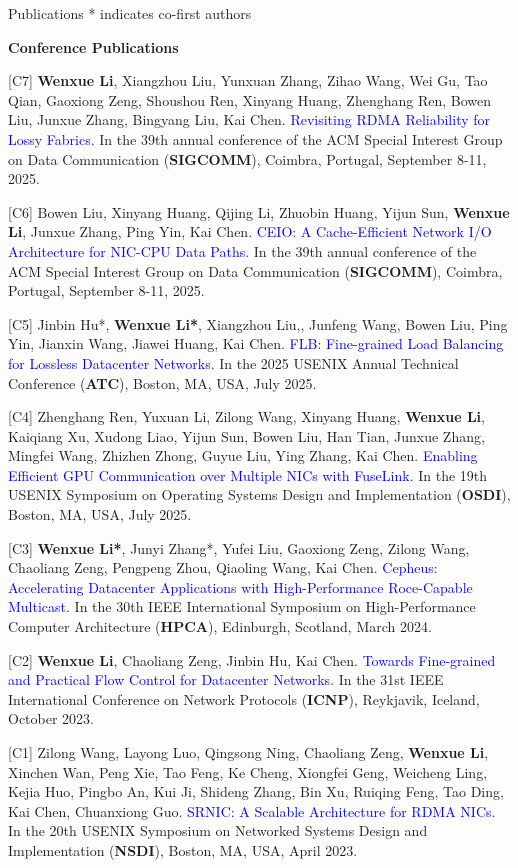\documentclass{resume} %
\newcommand{\blue}[1]{\textcolor{blue}{#1}}
\begin{document}
\begin{rSection}{Publications}
* indicates co-first authors 

\textbf{Conference Publications}

[C7] \textbf{Wenxue Li}, Xiangzhou Liu, Yunxuan Zhang, Zihao Wang, Wei Gu, Tao Qian, Gaoxiong Zeng, Shoushou Ren, Xinyang Huang, Zhenghang Ren, Bowen Liu, Junxue Zhang, Bingyang Liu, Kai Chen. \blue{Revisiting RDMA Reliability for Lossy Fabrics.} In the 39th annual conference of the ACM Special Interest Group on Data Communication (\textbf{SIGCOMM}), Coimbra, Portugal, September 8-11, 2025.

[C6] Bowen Liu, Xinyang Huang, Qijing Li, Zhuobin Huang, Yijun Sun, \textbf{Wenxue Li}, Junxue Zhang, Ping Yin, Kai Chen. \blue{CEIO: A Cache-Efficient Network I/O Architecture for NIC-CPU Data Paths.} In the 39th annual conference of the ACM Special Interest Group on Data Communication (\textbf{SIGCOMM}), Coimbra, Portugal, September 8-11, 2025.

[C5] Jinbin Hu*, \textbf{Wenxue Li*}, Xiangzhou Liu,, Junfeng Wang, Bowen Liu, Ping Yin, Jianxin Wang, Jiawei Huang, Kai Chen. \blue{FLB: Fine-grained Load Balancing for Lossless Datacenter Networks.} In the 2025 USENIX Annual Technical Conference (\textbf{ATC}), Boston, MA, USA, July 2025.

[C4] Zhenghang Ren, Yuxuan Li, Zilong Wang, Xinyang Huang, \textbf{Wenxue Li}, Kaiqiang Xu, Xudong Liao, Yijun Sun, Bowen Liu, Han Tian, Junxue Zhang, Mingfei Wang, Zhizhen Zhong, Guyue Liu, Ying Zhang, Kai Chen. \blue{Enabling Efficient GPU Communication over Multiple NICs with FuseLink.} In the 19th USENIX Symposium on Operating Systems Design and Implementation (\textbf{OSDI}), Boston, MA, USA, July 2025.

[C3] \textbf{Wenxue Li*}, Junyi Zhang*, Yufei Liu, Gaoxiong Zeng, Zilong Wang, Chaoliang Zeng, Pengpeng Zhou, Qiaoling Wang, Kai Chen. \blue{Cepheus: Accelerating Datacenter Applications with High-Performance Roce-Capable Multicast.} In the 30th IEEE International Symposium on High-Performance Computer Architecture (\textbf{HPCA}), Edinburgh, Scotland, March 2024.

[C2] \textbf{Wenxue Li}, Chaoliang Zeng, Jinbin Hu, Kai Chen. \blue{Towards Fine-grained and Practical Flow Control for Datacenter Networks.} In the 31st IEEE International Conference on Network Protocols (\textbf{ICNP}), Reykjavik, Iceland, October 2023.

[C1] Zilong Wang, Layong Luo, Qingsong Ning, Chaoliang Zeng, \textbf{Wenxue Li}, Xinchen Wan, Peng Xie, Tao Feng, Ke Cheng, Xiongfei Geng, Weicheng Ling, Kejia Huo, Pingbo An, Kui Ji, Shideng Zhang, Bin Xu, Ruiqing Feng, Tao Ding, Kai Chen, Chuanxiong Guo. \blue{SRNIC: A Scalable Architecture for RDMA NICs.} In the 20th USENIX Symposium on Networked Systems Design and Implementation (\textbf{NSDI}), Boston, MA, USA, April 2023.


\end{rSection}
\end{document}
